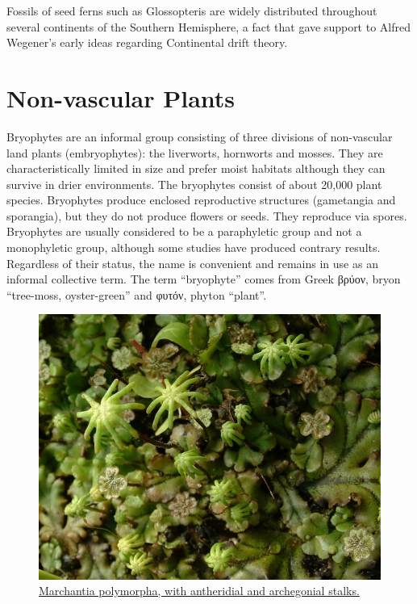 Fossils of seed ferns such as Glossopteris are widely distributed throughout several continents of the Southern Hemisphere, a fact that gave support to Alfred Wegener's early ideas regarding Continental drift theory.

\hypertarget{non-vascular-plants}{%
\section{Non-vascular Plants}\label{non-vascular-plants}}

Bryophytes are an informal group consisting of three divisions of non-vascular land plants (embryophytes): the liverworts, hornworts and mosses. They are characteristically limited in size and prefer moist habitats although they can survive in drier environments. The bryophytes consist of about 20,000 plant species. Bryophytes produce enclosed reproductive structures (gametangia and sporangia), but they do not produce flowers or seeds. They reproduce via spores. Bryophytes are usually considered to be a paraphyletic group and not a monophyletic group, although some studies have produced contrary results. Regardless of their status, the name is convenient and remains in use as an informal collective term. The term ``bryophyte'' comes from Greek βρύον, bryon ``tree-moss, oyster-green'' and φυτόν, phyton ``plant''.



\begin{figure}

{\centering \includegraphics[width=0.7\linewidth]{./figures/plants/Marchantia} 

}

\caption{\href{https://upload.wikimedia.org/wikipedia/commons/d/dc/Marchantia.jpg}{Marchantia polymorpha, with antheridial and archegonial stalks.}}\label{fig:marchantia}
\end{figure}



